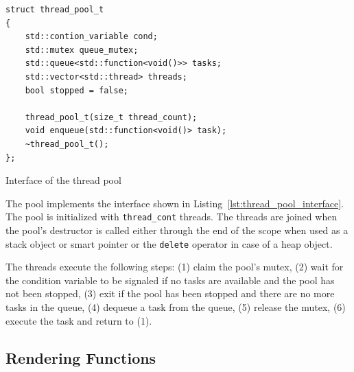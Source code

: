\documentclass[a4paper, 11pt]{memoir}
\begin{document}
    \begin{listing}[H]
        \begin{verbatim}
struct thread_pool_t
{
    std::contion_variable cond;
    std::mutex queue_mutex;
    std::queue<std::function<void()>> tasks;
    std::vector<std::thread> threads;
    bool stopped = false;

    thread_pool_t(size_t thread_count);
    void enqueue(std::function<void()> task);
    ~thread_pool_t();
};
        \end{verbatim}
        \caption{Interface of the thread pool}
        \label{lst:thread_pool_interface}
    \end{listing}

    The pool implements the interface shown in Listing~\ref{lst:thread_pool_interface}.
    The pool is initialized with \texttt{thread_cont} threads. The threads are joined when the pool's destructor is called either through the end of the scope when
    used as a stack object or smart pointer or the \texttt{delete} operator in case of a heap object.

    The threads execute the following steps: (1) claim the pool's mutex, (2) wait for the condition variable to be signaled if no tasks are available and the pool
    has not been stopped, (3) exit if the pool has been stopped and there are no more tasks in the queue, (4) dequeue a task from the queue, (5) release the mutex, (6) execute
    the task and return to (1).


    \subsection{Rendering Functions}
    \label{sec:rendering_functions}
\end{document}
